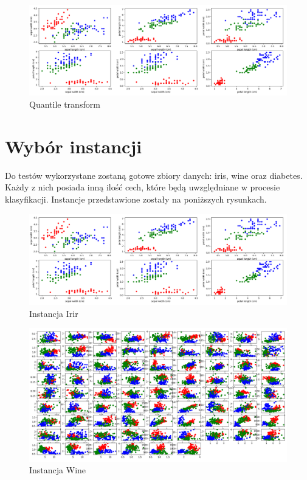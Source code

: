 \documentclass[12pt,a4paper]{article}
\begin{document}
\begin{figure}[H]
\centering
\includegraphics[width=1\textwidth]{discretization_quantile.PNG}
\caption{Quantile transform}
\end{figure}

\section{Wybór instancji}
Do testów wykorzystane zostaną gotowe zbiory danych: iris, wine oraz diabetes. Każdy z nich posiada inną ilość cech, które będą uwzględniane w procesie klasyfikacji. Instancje przedstawione zostały na poniższych rysunkach.

\begin{figure}[H]
\centering
\includegraphics[width=1\textwidth]{irisData.PNG}
\caption{Instancja Irir}
\end{figure}

\begin{figure}[H]
\centering
\includegraphics[width=1\textwidth]{wineData.PNG}
\caption{Instancja Wine}
\end{figure}
\end{document}
